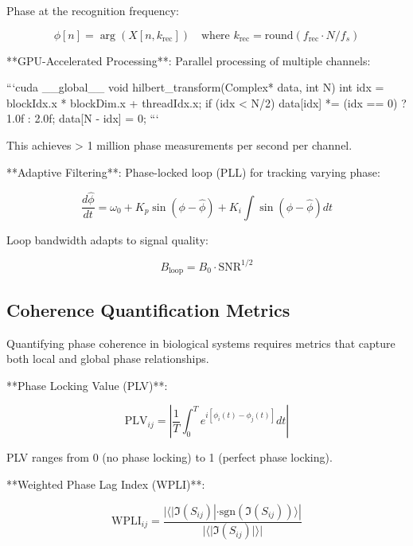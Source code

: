 \documentclass[12pt,a4paper]{report}
\begin{document}
Phase at the recognition frequency:

\begin{equation}
\phi[n] = \arg(X[n, k_{\text{rec}}]) \quad \text{where } k_{\text{rec}} = \text{round}(f_{\text{rec}} \cdot N / f_s)
\end{equation}

**GPU-Accelerated Processing**: Parallel processing of multiple channels:

```cuda
__global__ void hilbert_transform(Complex* data, int N) {
    int idx = blockIdx.x * blockDim.x + threadIdx.x;
    if (idx < N/2) {
        data[idx] *= (idx == 0) ? 1.0f : 2.0f;
        data[N - idx] = 0;
    }
}
```

This achieves > 1 million phase measurements per second per channel.

**Adaptive Filtering**: Phase-locked loop (PLL) for tracking varying phase:

\begin{equation}
\frac{d\hat{\phi}}{dt} = \omega_0 + K_p \sin(\phi - \hat{\phi}) + K_i \int \sin(\phi - \hat{\phi}) dt
\end{equation}

Loop bandwidth adapts to signal quality:

\begin{equation}
B_{\text{loop}} = B_0 \cdot \text{SNR}^{1/2}
\end{equation}

\subsection{Coherence Quantification Metrics}

Quantifying phase coherence in biological systems requires metrics that capture both local and global phase relationships.

**Phase Locking Value (PLV)**:

\begin{equation}
\text{PLV}_{ij} = \left|\frac{1}{T} \int_0^T e^{i[\phi_i(t) - \phi_j(t)]} dt\right|
\end{equation}

PLV ranges from 0 (no phase locking) to 1 (perfect phase locking).

**Weighted Phase Lag Index (WPLI)**:

\begin{equation}
\text{WPLI}_{ij} = \frac{|\langle |\Im(S_{ij})| \cdot \text{sgn}(\Im(S_{ij})) \rangle|}{|\langle |\Im(S_{ij})| \rangle|}
\end{equation}
\end{document}
